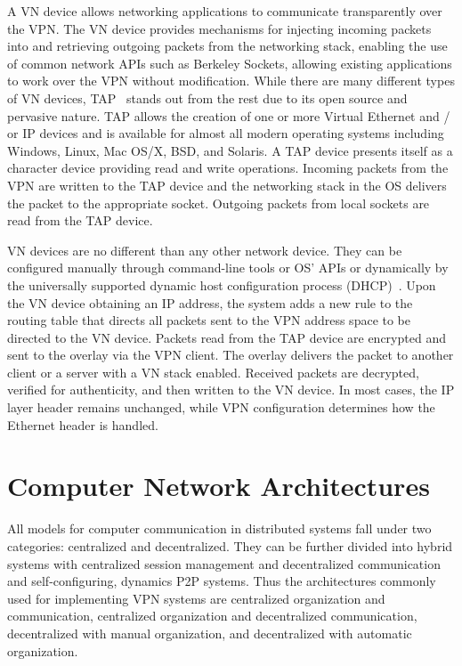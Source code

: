 A VN device allows networking applications to communicate transparently over
the VPN.  The VN device provides mechanisms for injecting incoming packets into
and retrieving outgoing packets from the networking stack, enabling the use of
common network APIs such as Berkeley Sockets, allowing existing applications to
work over the VPN without modification.  While there are many different types
of VN devices, TAP~\cite{tap} stands out from the rest due to its open source
and pervasive nature.  TAP allows the creation of one or more Virtual Ethernet
and / or IP devices and is available for almost all modern operating systems
including Windows, Linux, Mac OS/X, BSD, and Solaris.  A TAP device presents
itself as a character device providing read and write operations.  Incoming
packets from the VPN are written to the TAP device and the networking stack in
the OS delivers the packet to the appropriate socket.  Outgoing packets from
local sockets are read from the TAP device.

VN devices are no different than any other network device.  They can be
configured manually through command-line tools or OS' APIs or dynamically by
the universally supported dynamic host configuration process
(DHCP)~\cite{dhcp0, dhcp1}.  Upon the VN device obtaining an IP address, the
system adds a new rule to the routing table that directs all packets sent to
the VPN address space to be directed to the VN device.  Packets read from the
TAP device are encrypted and sent to the overlay via the VPN client.  The
overlay delivers the packet to another client or a server with a VN stack
enabled.  Received packets are decrypted, verified for authenticity, and then
written to the VN device.  In most cases, the IP layer header remains
unchanged, while VPN configuration determines how the Ethernet header is
handled.

\section{Computer Network Architectures}

All models for computer communication in distributed systems fall under two
categories:  centralized and decentralized.  They can be further divided into
hybrid systems with centralized session management and decentralized
communication and self-configuring, dynamics P2P systems.  Thus the
architectures commonly used for implementing VPN systems are centralized
organization and communication, centralized organization and decentralized
communication, decentralized with manual organization, and decentralized with
automatic organization.

